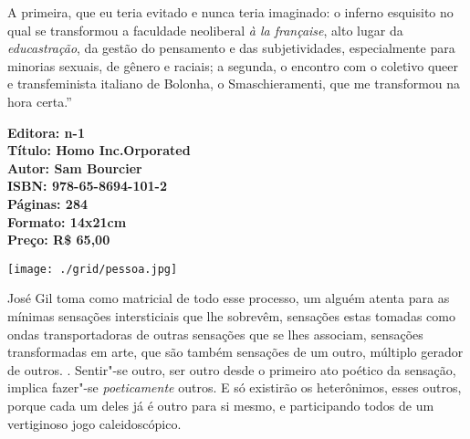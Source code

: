 \medskip

\noindent{} A primeira, que eu teria evitado e nunca teria imaginado: o inferno esquisito no qual se transformou a faculdade neoliberal \textit{à la française}, alto lugar da \textit{educastração}, da gestão do pensamento e das subjetividades, especialmente para minorias sexuais, de gênero e raciais; a segunda, o encontro com o coletivo queer e transfeminista italiano de Bolonha, o Smaschieramenti, que me transformou na hora certa.”

\vfill

\hspace*{-.4cm}\begin{minipage}[c]{.5\linewidth}
\small\textbf{
\hspace*{-.1cm}Editora: n-1\\
Título: Homo Inc.Orporated\\
Autor: Sam Bourcier\\ 
ISBN: 978-65-8694-101-2\\
Páginas: 284\\
Formato: 14x21cm\\
Preço: R\$ 65,00\\
}
\end{minipage}

\pagebreak %


\begin{center}
\hspace*{-3.6cm}
\hspace*{3.1cm}\texttt{[image: ./grid/pessoa.jpg]}
\end{center}

\hspace*{-7cm}\hrulefill\hspace*{-7cm}

\medskip

\noindent{}José Gil toma como matricial de todo esse processo, um alguém atenta para as mínimas sensações intersticiais que lhe sobrevêm, sensações estas tomadas como ondas transportadoras de outras sensações que se lhes associam, sensações transformadas em arte, que são também sensações de um outro, múltiplo gerador de outros. . Sentir"-se outro, ser outro desde o primeiro ato poético da sensação, implica fazer"-se \textit{poeticamente} outros. E só existirão os heterônimos, esses outros, porque cada um deles já é outro para si mesmo, e participando todos de um vertiginoso jogo caleidoscópico. 

